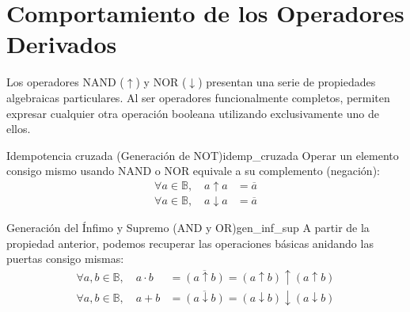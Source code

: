 \section{Comportamiento de los Operadores Derivados}
Los operadores NAND ($\uparrow$) y NOR ($\downarrow$) presentan una serie de propiedades algebraicas particulares. Al ser operadores funcionalmente completos, permiten expresar cualquier otra operación booleana utilizando exclusivamente uno de ellos.

\begin{teorema}{Idempotencia cruzada (Generación de NOT)}{idemp_cruzada}
Operar un elemento consigo mismo usando NAND o NOR equivale a su complemento (negación):
\begin{align*}
    \forall a \in \mathbb{B}, \quad a \uparrow a &= \overline{a} \\
    \forall a \in \mathbb{B}, \quad a \downarrow a &= \overline{a}
\end{align*}
\end{teorema}

\begin{teorema}{Generación del Ínfimo y Supremo (AND y OR)}{gen_inf_sup}
A partir de la propiedad anterior, podemos recuperar las operaciones básicas anidando las puertas consigo mismas:
\begin{align*}
    \forall a, b \in \mathbb{B}, \quad a \cdot b &= \overline{(a \uparrow b)} = (a \uparrow b) \uparrow (a \uparrow b) \\
    \forall a, b \in \mathbb{B}, \quad a + b &= \overline{(a \downarrow b)} = (a \downarrow b) \downarrow (a \downarrow b)
\end{align*}
\end{teorema}

